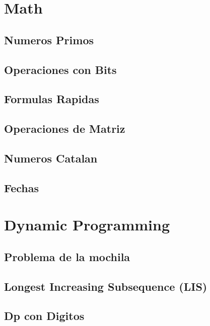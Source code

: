 \section{Math}
\subsection{Numeros Primos}
\raggedbottom
\hrulefill
\subsection{Operaciones con Bits}
\raggedbottom
\hrulefill
\subsection{Formulas Rapidas}
\raggedbottom
\hrulefill
\subsection{Operaciones de Matriz}
\raggedbottom
\hrulefill
\subsection{Numeros Catalan}
\raggedbottom
\hrulefill
\subsection{Fechas}
\raggedbottom
\hrulefill

\section{Dynamic Programming}
\subsection{Problema de la mochila}
\raggedbottom
\hrulefill
\subsection{Longest Increasing Subsequence (LIS)}
\raggedbottom
\hrulefill
\subsection{Dp con Digitos}
\raggedbottom
\hrulefill
